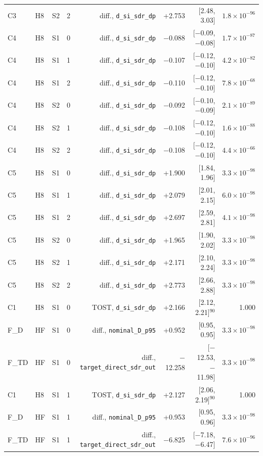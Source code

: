\begin{longtable}{@{}llllrrrr@{}}
C3 & H8 & S2 & 2 & diff., \texttt{d\_si\_sdr\_dp} & +2.753 & [2.48, 3.03] & $1.8\times10^{-96}$ \\
C4 & H8 & S1 & 0 & diff., \texttt{d\_si\_sdr\_dp} & $-$0.088 & [$-$0.09, $-$0.08] & $1.7\times10^{-87}$ \\
C4 & H8 & S1 & 1 & diff., \texttt{d\_si\_sdr\_dp} & $-$0.107 & [$-$0.12, $-$0.10] & $4.2\times10^{-82}$ \\
C4 & H8 & S1 & 2 & diff., \texttt{d\_si\_sdr\_dp} & $-$0.110 & [$-$0.12, $-$0.10] & $7.8\times10^{-68}$ \\
C4 & H8 & S2 & 0 & diff., \texttt{d\_si\_sdr\_dp} & $-$0.092 & [$-$0.10, $-$0.09] & $2.1\times10^{-89}$ \\
C4 & H8 & S2 & 1 & diff., \texttt{d\_si\_sdr\_dp} & $-$0.108 & [$-$0.12, $-$0.10] & $1.6\times10^{-88}$ \\
C4 & H8 & S2 & 2 & diff., \texttt{d\_si\_sdr\_dp} & $-$0.108 & [$-$0.12, $-$0.10] & $4.4\times10^{-66}$ \\
C5 & H8 & S1 & 0 & diff., \texttt{d\_si\_sdr\_dp} & +1.900 & [1.84, 1.96] & $3.3\times10^{-98}$ \\
C5 & H8 & S1 & 1 & diff., \texttt{d\_si\_sdr\_dp} & +2.079 & [2.01, 2.15] & $6.0\times10^{-98}$ \\
C5 & H8 & S1 & 2 & diff., \texttt{d\_si\_sdr\_dp} & +2.697 & [2.59, 2.81] & $4.1\times10^{-98}$ \\
C5 & H8 & S2 & 0 & diff., \texttt{d\_si\_sdr\_dp} & +1.965 & [1.90, 2.02] & $3.3\times10^{-98}$ \\
C5 & H8 & S2 & 1 & diff., \texttt{d\_si\_sdr\_dp} & +2.171 & [2.10, 2.24] & $3.3\times10^{-98}$ \\
C5 & H8 & S2 & 2 & diff., \texttt{d\_si\_sdr\_dp} & +2.773 & [2.66, 2.88] & $3.3\times10^{-98}$ \\
C1 & H8 & S1 & 0 & TOST, \texttt{d\_si\_sdr\_dp} & +2.166 & [2.12, 2.21]$^{90}$ & 1.000 \\
F\_D & HF & S1 & 0 & diff., \texttt{nominal\_D\_p95} & +0.952 & [0.95, 0.95] & $3.3\times10^{-98}$ \\
F\_TD & HF & S1 & 0 & diff., \texttt{target\_direct\_sdr\_out} & $-$12.258 & [$-$12.53, $-$11.98] & $3.3\times10^{-98}$ \\
C1 & H8 & S1 & 1 & TOST, \texttt{d\_si\_sdr\_dp} & +2.127 & [2.06, 2.19]$^{90}$ & 1.000 \\
F\_D & HF & S1 & 1 & diff., \texttt{nominal\_D\_p95} & +0.953 & [0.95, 0.96] & $3.3\times10^{-98}$ \\
F\_TD & HF & S1 & 1 & diff., \texttt{target\_direct\_sdr\_out} & $-$6.825 & [$-$7.18, $-$6.47] & $7.6\times10^{-96}$ \\

\end{longtable}
